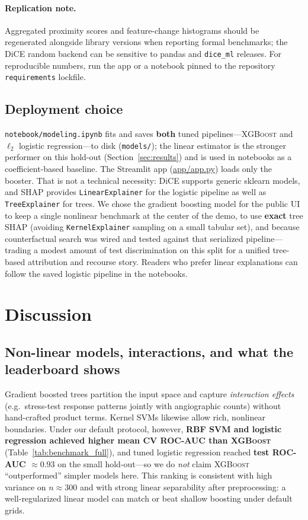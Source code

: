 \documentclass[11pt,a4paper]{article}
\begin{document}
\paragraph{Replication note.}
Aggregated proximity scores and feature-change histograms should be regenerated alongside library versions when reporting formal benchmarks; the DiCE random backend can be sensitive to pandas and \texttt{dice\_ml} releases. For reproducible numbers, run the app or a notebook pinned to the repository \texttt{requirements} lockfile.

\subsection{Deployment choice}
\label{sec:deployment_choice}

\texttt{notebook/modeling.ipynb} fits and saves \textbf{both} tuned pipelines---\textsc{XGBoost} and $\ell_2$ logistic regression---to disk (\texttt{models/}); the linear estimator is the stronger performer on this hold-out (Section~\ref{sec:results}) and is used in notebooks as a coefficient-based baseline. The Streamlit app (\url{app/app.py}) loads only the booster. That is not a technical necessity: DiCE supports generic sklearn models, and SHAP provides \texttt{LinearExplainer} for the logistic pipeline as well as \texttt{TreeExplainer} for trees. We chose the gradient boosting model for the public UI to keep a single nonlinear benchmark at the center of the demo, to use \textbf{exact} tree SHAP (avoiding \texttt{KernelExplainer} sampling on a small tabular set), and because counterfactual search was wired and tested against that serialized pipeline---trading a modest amount of test discrimination on this split for a unified tree-based attribution and recourse story. Readers who prefer linear explanations can follow the saved logistic pipeline in the notebooks.

\section{Discussion}
\label{sec:discussion}

\subsection{Non-linear models, interactions, and what the leaderboard shows}

Gradient boosted trees partition the input space and capture \emph{interaction effects} (e.g.\ stress-test response patterns jointly with angiographic counts) without hand-crafted product terms. Kernel SVMs likewise allow rich, nonlinear boundaries. Under our default protocol, however, \textbf{RBF SVM and logistic regression achieved higher mean CV ROC-AUC than \textsc{XGBoost}} (Table~\ref{tab:benchmark_full}), and tuned logistic regression reached \textbf{test ROC-AUC $\approx\num{0.93}$} on the small hold-out—so we do \emph{not} claim \textsc{XGBoost} ``outperformed'' simpler models here. This ranking is consistent with high variance on $n\approx 300$ and with strong linear separability after preprocessing: a well-regularized linear model can match or beat shallow boosting under default grids.
\end{document}
